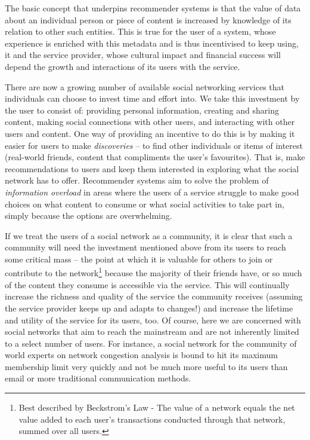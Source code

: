\documentclass[a4paper,12pt,twoside,notitlepage]{report}
\begin{document}
The basic concept that underpins recommender systems is that the value of data
about an individual person or piece of content is increased by knowledge of its
relation to other such entities. This is true for the user of a system, whose
experience is enriched with this metadata and is thus incentivised to keep
using, it and the service provider, whose cultural impact and financial success
will depend the growth and interactions of its users with the service.

There are now a growing number of available social networking services that
individuals can choose to invest time and effort into. We take this investment
by the user to consist of: providing personal information, creating and sharing
content, making social connections with other users, and interacting with other
users and content. One way of providing an incentive to do this is by making it
easier for users to make \emph{discoveries} -- to find other individuals or
items of interest (real-world friends, content that compliments the user's
favourites). That is, make recommendations to users and keep them interested in
exploring what the social network has to offer. Recommender systems aim
to solve the problem of \emph{information overload} in areas where the users of
a service struggle to make good choices on what content to consume or what
social activities to take part in, simply because the options are overwhelming.

If we treat the users of a social network as a community, it is clear that such
a community will need the investment mentioned above from its users to reach
some critical mass -- the point at which it is valuable for others to join 
or contribute to the network\footnote{Best described by Beckstrom's Law - The
value of a network equals the net value added to each user's transactions
conducted through that network, summed over all users.} because the majority of
their friends have, or so much of the content they consume is accessible via the
service. This will continually increase the richness and quality of the service
the community receives (assuming the service provider keeps up and adapts to
changes!) and increase the lifetime and utility of the service for its users,
too. Of course, here we are concerned with social networks that aim to reach the
mainstream and are not inherently limited to a select number of users. For
instance, a social network for the community of world experts on network
congestion analysis is bound to hit its maximum membership limit very quickly
and not be much more useful to its users than email or more traditional
communication methods.
\end{document}
